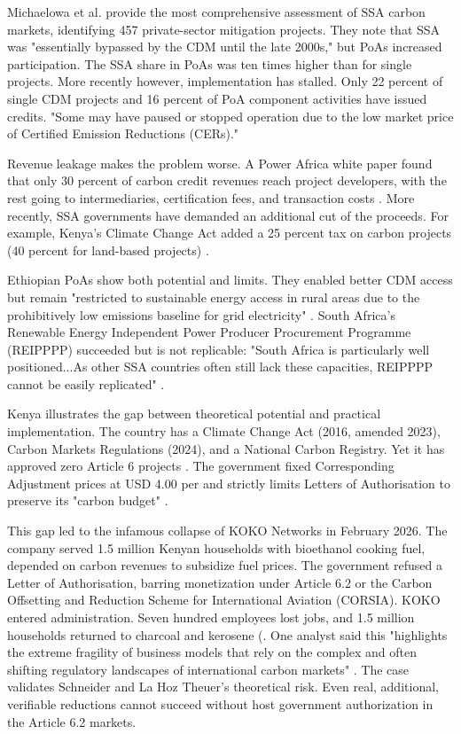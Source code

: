 Michaelowa et al. \cite{michaelowa-mobilising} provide the most comprehensive assessment of SSA carbon markets, identifying 457 private-sector mitigation projects. They note that SSA was "essentially bypassed by the CDM until the late 2000s," but PoAs increased participation. The SSA share in PoAs was ten times higher than for single projects. More recently however, implementation has stalled. Only 22 percent of single CDM projects and 16 percent of PoA component activities have issued credits. "Some may have paused or stopped operation due to the low market price of Certified Emission Reductions (CERs)."

Revenue leakage makes the problem worse. A Power Africa white paper found that only 30 percent of carbon credit revenues reach project developers, with the rest going to intermediaries, certification fees, and transaction costs \cite{power-africa-credits}. More recently, SSA governments have demanded an additional cut of the proceeds. For example, Kenya's Climate Change Act added a 25 percent tax on carbon projects (40 percent for land-based projects) \cite{kenya-climate-change-act}.

Ethiopian PoAs show both potential and limits. They enabled better CDM access but remain "restricted to sustainable energy access in rural areas due to the prohibitively low emissions baseline for grid electricity" \cite{michaelowa-mobilising}. South Africa's Renewable Energy Independent Power Producer Procurement Programme (REIPPPP) succeeded but is not replicable: "South Africa is particularly well positioned...As other SSA countries often still lack these capacities, REIPPPP cannot be easily replicated" \cite{michaelowa-mobilising}.

Kenya illustrates the gap between theoretical potential and practical implementation. The country has a Climate Change Act (2016, amended 2023), Carbon Markets Regulations (2024), and a National Carbon Registry. Yet it has approved zero Article 6 projects \cite{kenya-zero-approvals}. The government fixed Corresponding Adjustment prices at USD 4.00 per \tcooe and strictly limits Letters of Authorisation to preserve its "carbon budget" \cite{kenya-carbon-budget}.

This gap led to the infamous collapse of KOKO Networks in February 2026. The company served 1.5 million Kenyan households with bioethanol cooking fuel, depended on carbon revenues to subsidize fuel prices. The government refused a Letter of Authorisation, barring monetization under Article 6.2 or the Carbon Offsetting and Reduction Scheme for International Aviation (CORSIA). KOKO entered administration. Seven hundred employees lost jobs, and 1.5 million households returned to charcoal and kerosene (\cite{koko-disrupt,koko-econews}. One analyst said this "highlights the extreme fragility of business models that rely on the complex and often shifting regulatory landscapes of international carbon markets" \cite{koko-econews}. The case validates Schneider and La Hoz Theuer's \cite{schneider-integrity} theoretical risk. Even real, additional, verifiable reductions cannot succeed without host government authorization in the Article 6.2 markets.

